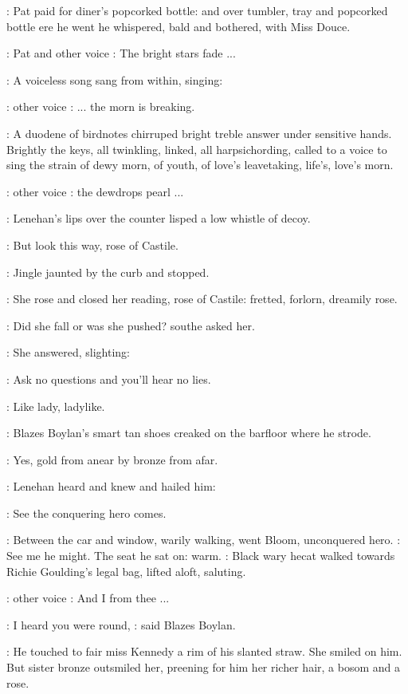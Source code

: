:
Pat paid for diner's popcorked bottle: and over tumbler, tray and
popcorked bottle ere he went he whispered, bald and bothered, with Miss
Douce.

\Stage:
Pat and other voice
\Song:
The bright stars fade ...

:
A voiceless song sang from within, singing:

\Stage:
other voice
\Song:
... the morn is breaking.

:
A duodene of birdnotes chirruped bright treble answer under sensitive
hands. Brightly the keys, all twinkling, linked, all harpsichording,
called to a voice to sing the strain of dewy morn, of youth, of love's
leavetaking, life's, love's morn.

\Stage:
other voice
\Song:
the dewdrops pearl ...

:
Lenehan's lips over the counter lisped a low whistle of decoy.

\Lenehan:
But look this way, rose of Castile.

:
Jingle jaunted by the curb
and stopped.

:
She rose and closed her reading, rose of Castile: fretted, forlorn,
dreamily rose.

\Lenehan:
Did she fall or was she pushed?
sout{he asked her.}

:
She answered, slighting:

\MissK:
Ask no questions and you'll hear no lies.

:
Like lady, ladylike.

:
Blazes Boylan's smart tan shoes creaked on the barfloor where he
strode.

:
Yes, gold from anear by bronze from afar.

:
Lenehan heard and knew and hailed him:

\Lenehan:
See the conquering hero comes.

:
Between the car and window, warily walking, went Bloom,
unconquered hero.
\BloomInt:
See me he might. The seat he sat on: warm.
:
Black wary hecat walked towards Richie Goulding's legal bag,
lifted aloft, saluting.

\Stage:
other voice
\Song:
And I from thee ...

\boylan:
I heard you were round,
:
said Blazes Boylan.

:
He touched to fair miss Kennedy a rim of his slanted straw. She
smiled on him. But sister bronze outsmiled her, preening for him her
richer hair, a bosom and a rose.

